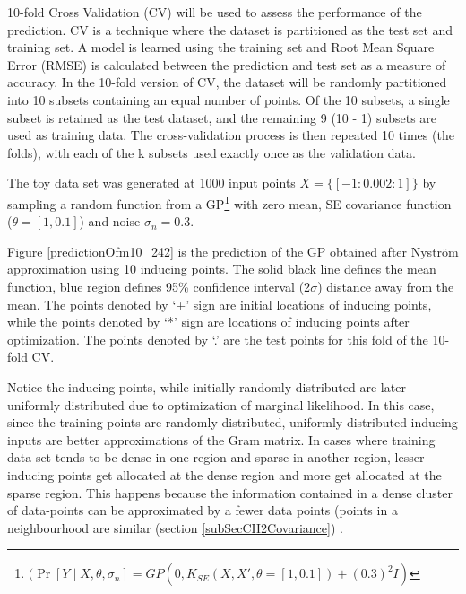 10-fold Cross Validation (CV) will be used to assess the performance of the prediction. CV is a technique where the dataset is partitioned as the test set and training set. A model is learned using the training set and Root Mean Square Error (RMSE) is calculated between the prediction and test set as a measure of accuracy. In the 10-fold version of CV, the dataset will be randomly partitioned into 10 subsets containing an equal number of points. Of the 10 subsets, a single subset is retained as the test dataset, and the remaining 9 (10 - 1) subsets are used as training data. The cross-validation process is then repeated 10 times (the folds), with each of the k subsets used exactly once as the validation data.

The toy data set was generated at 1000 input points \(X = \{[-1:0.002:1]\}\) by sampling a random function from a GP\footnote{\((\Pr[Y \mid X, \theta, \sigma_{n}] = GP(0, K_{SE}(X, X', \theta = [1, 0.1]) + (0.3)^{2}I)\)} with zero mean, SE covariance function (\(\theta = [1, 0.1]\)) and noise \(\sigma_{n} = 0.3\). 

Figure \ref{predictionOfm10_242} is the prediction of the GP obtained after Nystr\"{o}m approximation using 10 inducing points. The solid black line defines the mean function, blue region defines 95\% confidence interval (2\(\sigma\)) distance away from the mean. The points denoted by `+' sign are initial locations of inducing points, while the points denoted by `*' sign are locations of inducing points after optimization. The points denoted by `.' are the test points for this fold of the 10-fold CV. 

Notice the inducing points, while initially randomly distributed are later uniformly distributed due to optimization of marginal likelihood. In this case, since the training points are randomly distributed, uniformly distributed inducing inputs are better approximations of the Gram matrix. In cases where training data set tends to be dense in one region and sparse in another region, lesser inducing points get allocated at the dense region and more get allocated at the sparse region. This happens because the information contained in a dense cluster of data-points can be approximated by a fewer data points (points in a neighbourhood are similar (section \ref{subSecCH2Covariance}) \cite{Snelson06sparsegaussian}.


